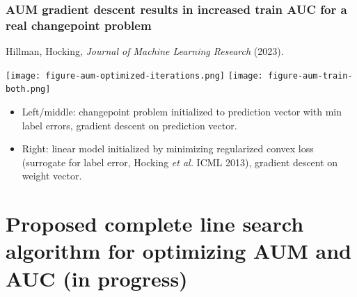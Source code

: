 \documentclass[t]{beamer}
\begin{document}
\begin{frame}
  \frametitle{AUM gradient descent results in increased train AUC for
    a real changepoint problem}
 
Hillman, Hocking, \emph{Journal of Machine Learning Research} (2023).

\texttt{[image: figure-aum-optimized-iterations.png]}
\texttt{[image: figure-aum-train-both.png]}

\begin{itemize}
\item Left/middle: changepoint problem initialized to prediction vector with
  min label errors, gradient descent on prediction vector.
\item Right: linear model initialized by minimizing regularized convex
  loss (surrogate for label error, Hocking \emph{et al.} ICML 2013),
  gradient descent on weight vector.
\end{itemize}

\end{frame}

\section{Proposed complete line search algorithm for optimizing AUM and AUC (in progress)} 
\end{document}
